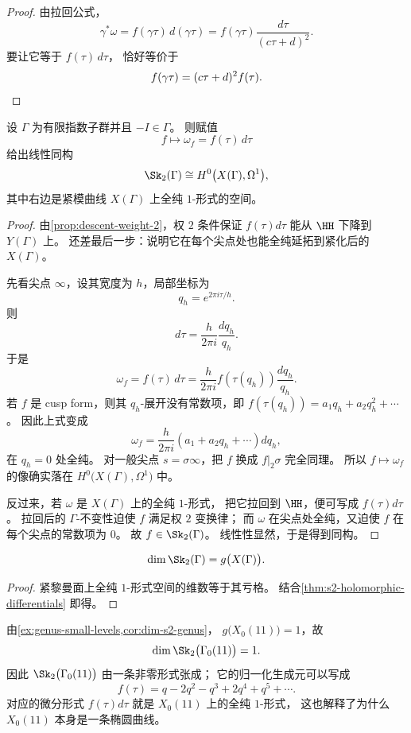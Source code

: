\begin{proof}
由拉回公式，
\[
  \gamma^*\omega=f(\gamma\tau)\,d(\gamma\tau)
  =f(\gamma\tau)\frac{d\tau}{(c\tau+d)^2}.
\]
要让它等于 $f(\tau)\,d\tau$，
恰好等价于
\[
  f(\gamma\tau)=(c\tau+d)^2f(\tau).
\qedhere
\]
\end{proof}

\begin{theorem}
\label{thm:s2-holomorphic-differentials}
设 $\Gamma$ 为有限指数子群并且 $-I\in\Gamma$。
则赋值
\[
  f \longmapsto \omega_f=f(\tau)\,d\tau
\]
给出线性同构
\[
  \Sk_2(\Gamma)\cong H^0\bigl(X(\Gamma),\Omega^1\bigr),
\]
其中右边是紧模曲线 $X(\Gamma)$ 上全纯 $1$-形式的空间。
\end{theorem}

\begin{proof}
由\cref{prop:descent-weight-2}，权 $2$ 条件保证 $f(\tau)d\tau$ 能从 $\HH$ 下降到
$Y(\Gamma)$ 上。
还差最后一步：说明它在每个尖点处也能全纯延拓到紧化后的 $X(\Gamma)$。

先看尖点 $\infty$，设其宽度为 $h$，局部坐标为
\[
  q_h=e^{2\pi i\tau/h}.
\]
则
\[
  d\tau=\frac{h}{2\pi i}\frac{dq_h}{q_h}.
\]
于是
\[
  \omega_f=f(\tau)\,d\tau
  =\frac{h}{2\pi i}f(\tau(q_h))\frac{dq_h}{q_h}.
\]
若 $f$ 是 cusp form，则其 $q_h$-展开没有常数项，即
$f(\tau(q_h))=a_1q_h+a_2q_h^2+\cdots$。
因此上式变成
\[
  \omega_f=\frac{h}{2\pi i}(a_1+a_2q_h+\cdots)dq_h,
\]
在 $q_h=0$ 处全纯。
对一般尖点 $s=\sigma\infty$，把 $f$ 换成 $f|_2\sigma$ 完全同理。
所以 $f\mapsto \omega_f$ 的像确实落在
$H^0\bigl(X(\Gamma),\Omega^1\bigr)$ 中。

反过来，若 $\omega$ 是 $X(\Gamma)$ 上的全纯 $1$-形式，
把它拉回到 $\HH$，便可写成 $f(\tau)d\tau$。
拉回后的 $\Gamma$-不变性迫使 $f$ 满足权 $2$ 变换律；
而 $\omega$ 在尖点处全纯，又迫使 $f$ 在每个尖点的常数项为 $0$。
故 $f\in\Sk_2(\Gamma)$。
线性性显然，于是得到同构。
\end{proof}

\begin{corollary}
\label{cor:dim-s2-genus}
\[
  \dim \Sk_2(\Gamma)=g\bigl(X(\Gamma)\bigr).
\]
\end{corollary}

\begin{proof}
紧黎曼面上全纯 $1$-形式空间的维数等于其亏格。
结合\cref{thm:s2-holomorphic-differentials} 即得。
\end{proof}

\begin{example}
\label{ex:x011-weight2}
由\cref{ex:genus-small-levels,cor:dim-s2-genus}，
$g\bigl(X_0(11)\bigr)=1$，故
\[
  \dim \Sk_2\bigl(\Gamma_0(11)\bigr)=1.
\]
因此 $\Sk_2\bigl(\Gamma_0(11)\bigr)$ 由一条非零形式张成；
它的归一化生成元可以写成
\[
  f(\tau)=q-2q^2-q^3+2q^4+q^5+\cdots.
\]
对应的微分形式 $f(\tau)d\tau$ 就是 $X_0(11)$ 上的全纯 $1$-形式，
这也解释了为什么 $X_0(11)$ 本身是一条椭圆曲线。
\end{example}

